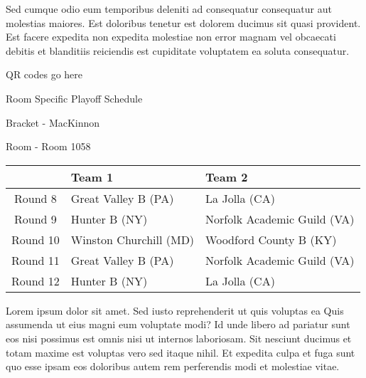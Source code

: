 \documentclass{article}%
\begin{document}
\newline%
Sed cumque odio eum temporibus deleniti ad consequatur consequatur aut molestias maiores. Est doloribus tenetur est dolorem ducimus sit quasi provident. Est facere expedita non expedita molestiae non error magnam vel obcaecati debitis et blanditiis reiciendis est cupiditate voluptatem ea soluta consequatur.%
\vspace*{140pt}%
\begin{center}%
\begin{Huge}%
QR codes go here%
\end{Huge}%
\end{center}%
\newpage%
\begin{center}%
\begin{Huge}%
Room Specific Playoff Schedule%
\end{Huge}%
\vspace*{8pt}%
\linebreak%
\begin{Large}%
Bracket {-} MacKinnon%
\end{Large}%
\vspace*{8pt}%
\linebreak%
\vspace*{8pt}%
\begin{Large}%
Room {-} Room 1058%
\end{Large}%
\end{center}%
%
\begin{tabularx}{\textwidth}{|c|Y|Y|}%
\hline%
&Team 1&Team 2\\%
\hline%
Round 8&Great Valley B (PA)&La Jolla (CA)\\%
Round 9&Hunter B (NY)&Norfolk Academic Guild (VA)\\%
Round 10&Winston Churchill (MD)&Woodford County B (KY)\\%
Round 11&Great Valley B (PA)&Norfolk Academic Guild (VA)\\%
Round 12&Hunter B (NY)&La Jolla (CA)\\%
\hline%
\end{tabularx}%
\vspace*{8pt}%
\newline%
Lorem ipsum dolor sit amet. Sed iusto reprehenderit ut quis voluptas ea Quis assumenda ut eius magni eum voluptate modi? Id unde libero ad pariatur sunt eos nisi possimus est omnis nisi ut internos laboriosam. Sit nesciunt ducimus et totam maxime est voluptas vero sed itaque nihil. Et expedita culpa et fuga sunt quo esse ipsam eos doloribus autem rem perferendis modi et molestiae vitae.\newline%
\end{document}
